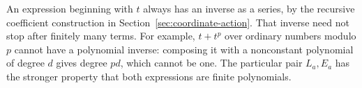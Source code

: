 An expression beginning with \(t\) always has an inverse as a series, by the recursive coefficient construction in Section~\ref{sec:coordinate-action}. That inverse need not stop after finitely many terms. For example, \(t+t^p\) over ordinary numbers modulo \(p\) cannot have a polynomial inverse: composing it with a nonconstant polynomial of degree \(d\) gives degree \(pd\), which cannot be one. The particular pair \(L_a,E_a\) has the stronger property that both expressions are finite polynomials.
